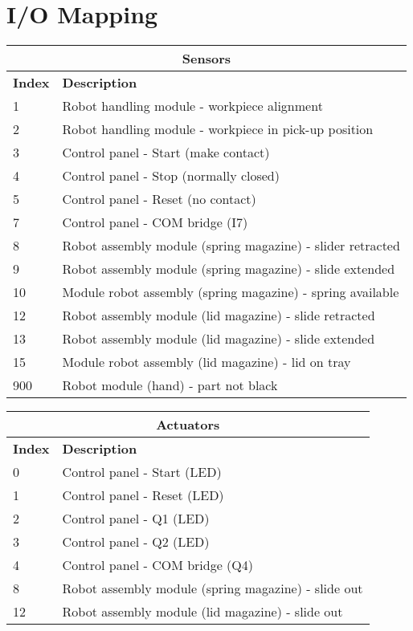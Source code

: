 \documentclass{article}
\begin{document}
\section{I/O Mapping}
\begin{center}
	\setlength\extrarowheight{4pt}
	\small
	\begin{tabularx}{\textwidth}{|p{1cm}|X|}
		\hline
		\multicolumn{2}{|c|}{\bf \color{black} \large Sensors}\\
		\hline\hline
		\bf Index & \bf Description\\
		\hline\hline
		1 & Robot handling module - workpiece alignment\\
		\hline
		2 & Robot handling module - workpiece in pick-up position\\
		\hline
		3 & Control panel - Start (make contact)\\
		\hline
		4 & Control panel - Stop (normally closed) \\
		\hline
		5 & Control panel - Reset (no contact)\\
		\hline
		7 & Control panel - COM bridge (I7)\\
		\hline
		8 & Robot assembly module (spring magazine) - slider retracted\\
		\hline
		9 & Robot assembly module (spring magazine) - slide extended\\
		\hline
		10 & Module robot assembly (spring magazine) - spring available \\
		\hline
		12 & Robot assembly module (lid magazine) - slide retracted\\
		\hline
		13 & Robot assembly module (lid magazine) - slide extended\\
		\hline
		15 & Module robot assembly (lid magazine) - lid on tray\\
		\hline
		900 & Robot module (hand) - part not black\\
		\hline
	\end{tabularx}
\end{center}
\begin{center}
	\setlength\extrarowheight{4pt}
	\small
	\begin{tabularx}{\textwidth}{|p{1cm}|X|}
		\hline
		\multicolumn{2}{|c|}{\bf \color{black} \large Actuators}\\
		\hline\hline
		\bf Index & \bf Description\\
		\hline\hline
		0 & Control panel - Start (LED)\\
		\hline
		1 & Control panel - Reset (LED)\\
		\hline
		2 & Control panel - Q1 (LED)\\
		\hline
		3 & Control panel - Q2 (LED)\\
		\hline
		4 & Control panel - COM bridge (Q4)\\
		\hline
		8 & Robot assembly module (spring magazine) - slide out\\
		\hline
		12 & Robot assembly module (lid magazine) - slide out\\
		\hline
	\end{tabularx}
\end{center}
\end{document}
